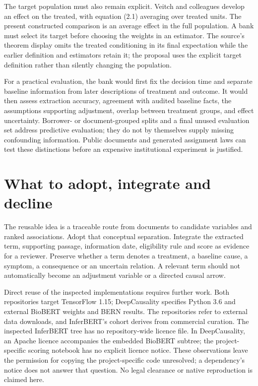 The target population must also remain explicit. Veitch and colleagues
develop an effect on the treated, with equation (2.1) averaging over treated
units. The present constructed comparison is an average effect in the full
population. A bank must select its target before choosing the weights in an
estimator. The source's theorem display omits the treated conditioning in
its final expectation while the earlier definition and estimators retain it;
the proposal uses the explicit target definition rather than silently
changing the population.
\citep[Section 2, equations (2.1)--(2.3); Section 3, Theorems 3.1--3.2]
{closure30veitch}

For a practical evaluation, the bank would first fix the decision time and
separate baseline information from later descriptions of treatment and
outcome. It would then assess extraction accuracy, agreement with audited
baseline facts, the assumptions supporting adjustment, overlap between
treatment groups, and effect uncertainty. Borrower- or document-grouped
splits and a final unused evaluation set address predictive evaluation;
they do not by themselves supply missing confounding information. Public
documents and generated assignment laws can test these distinctions before
an expensive institutional experiment is justified.

\section{What to adopt, integrate and decline}

The reusable idea is a traceable route from documents to candidate
variables and ranked associations. Adopt that conceptual separation.
Integrate the extracted term, supporting passage, information date,
eligibility rule and score as evidence for a reviewer. Preserve whether a
term denotes a treatment, a baseline cause, a symptom, a consequence or an
uncertain relation. A relevant term should not automatically become an
adjustment variable or a directed causal arrow.

Direct reuse of the inspected implementations requires further work. Both
repositories target TensorFlow 1.15; DeepCausality specifies Python 3.6 and
external BioBERT weights and BERN results. The repositories refer to external
data downloads, and InferBERT's cohort derives from commercial curation.
The inspected InferBERT tree has no repository-wide licence file. In
DeepCausality, an Apache licence accompanies the embedded BioBERT subtree;
the project-specific scoring notebook has no explicit licence notice.
These observations leave the permission for copying the project-specific
code unresolved; a dependency's notice does not answer that question.
No legal clearance or native reproduction is claimed here.
\citep{closure30inferbertcode,closure30deepcausalitycode}

